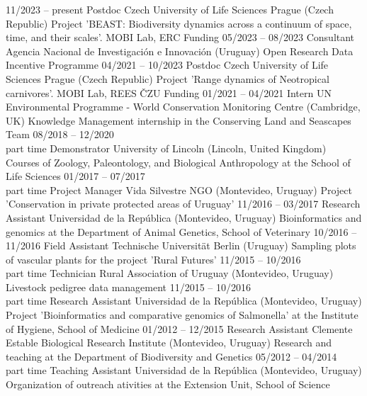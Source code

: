 \documentclass[9pt]{developercv} %
\begin{document}
\begin{entrylist}
	\entry
		{11/2023 -- present}
		{Postdoc}
		{Czech University of Life Sciences Prague (Czech Republic)}
		{Project 'BEAST: Biodiversity dynamics across a continuum of space, time, and their scales'. MOBI Lab, ERC Funding}
	\entry
		{05/2023 -- 08/2023}
		{Consultant}
		{Agencia Nacional de Investigación e Innovación (Uruguay)}
		{Open Research Data Incentive Programme}
	\entry
		{04/2021 -- 10/2023}
		{Postdoc}
		{Czech University of Life Sciences Prague (Czech Republic)}
		{Project 'Range dynamics of Neotropical carnivores'. MOBI Lab, REES ČZU Funding}
	\entry
		{01/2021 -- 04/2021}
		{Intern}
		{UN Environmental Programme - World Conservation Monitoring Centre (Cambridge, UK)}
		{Knowledge Management internship in the Conserving Land and Seascapes Team}
	\entry
		{08/2018 -- 12/2020\\\footnotesize{part time}}
		{Demonstrator}
		{University of Lincoln (Lincoln, United Kingdom)}
		{Courses of Zoology, Paleontology, and Biological Anthropology at the School of Life Sciences}
	\entry
		{01/2017 -- 07/2017\\\footnotesize{part time}}
		{Project Manager}
		{Vida Silvestre NGO (Montevideo, Uruguay)}
		{Project 'Conservation in private protected areas of Uruguay'}
	\entry
		{11/2016 -- 03/2017}
		{Research Assistant}
		{Universidad de la Rep\'{u}blica (Montevideo, Uruguay)}
		{Bioinformatics and genomics at the Department of Animal Genetics, School of Veterinary}
	\entry
		{10/2016 -- 11/2016}
		{Field Assistant}
		{Technische Universität Berlin (Uruguay)}
		{Sampling plots of vascular plants for the project 'Rural Futures'}
	\entry
		{11/2015 -- 10/2016\\\footnotesize{part time}}
		{Technician}
		{Rural Association of Uruguay (Montevideo, Uruguay)}
		{Livestock pedigree data management}
	\entry
		{11/2015 -- 10/2016\\\footnotesize{part time}}
		{Research Assistant}
		{Universidad de la Rep\'{u}blica (Montevideo, Uruguay)}
		{Project 'Bioinformatics and comparative genomics of Salmonella' at the Institute of Hygiene, School of Medicine}
	\entry
		{01/2012 -- 12/2015}
		{Research Assistant}
		{Clemente Estable Biological Research Institute (Montevideo, Uruguay)}
		{Research and teaching at the Department of Biodiversity and Genetics}
	\entry
		{05/2012 -- 04/2014\\\footnotesize{part time}}
		{Teaching Assistant}
		{Universidad de la Rep\'{u}blica (Montevideo, Uruguay)}
		{Organization of outreach ativities at the Extension Unit, School of Science}
\end{entrylist}
\end{document}
